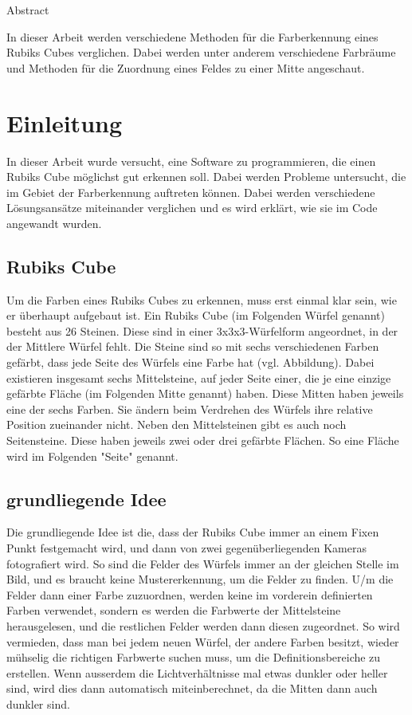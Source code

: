 \documentclass[a4paper, 12pt]{article}
\begin{document}
Abstract

In dieser Arbeit werden verschiedene Methoden für die Farberkennung eines Rubiks Cubes verglichen. Dabei werden unter anderem verschiedene Farbräume und Methoden für die Zuordnung eines Feldes zu einer Mitte angeschaut. 
\tableofcontents
\newpage
\section{Einleitung}
In dieser Arbeit wurde versucht, eine Software zu programmieren, die einen Rubiks Cube möglichst gut erkennen soll. Dabei werden Probleme untersucht, die im Gebiet der Farberkennung auftreten können. Dabei werden verschiedene Lösungsansätze miteinander verglichen und es wird erklärt, wie sie im Code angewandt wurden.
\subsection{Rubiks Cube}
Um die Farben eines Rubiks Cubes zu erkennen, muss erst einmal klar sein, wie er überhaupt aufgebaut ist. Ein Rubiks Cube (im Folgenden Würfel genannt) besteht aus 26 Steinen. Diese sind in einer 3x3x3-Würfelform angeordnet, in der der Mittlere Würfel fehlt. Die Steine sind so mit sechs verschiedenen Farben gefärbt, dass jede Seite des Würfels eine Farbe hat (vgl. Abbildung). Dabei existieren insgesamt sechs Mittelsteine, auf jeder Seite einer, die je eine einzige gefärbte Fläche (im Folgenden Mitte genannt) haben. Diese Mitten haben jeweils eine der sechs Farben. Sie ändern beim Verdrehen des Würfels ihre relative Position zueinander nicht. Neben den Mittelsteinen gibt es auch noch Seitensteine. Diese haben jeweils zwei oder drei gefärbte Flächen. So eine Fläche wird im Folgenden "Seite" genannt. 
\subsection{grundliegende Idee}
Die grundliegende Idee ist die, dass der Rubiks Cube immer an einem Fixen Punkt festgemacht wird, und dann von zwei gegenüberliegenden Kameras fotografiert wird. So sind die Felder des Würfels immer an der gleichen Stelle im Bild, und es braucht keine Mustererkennung, um die Felder zu finden. U/m die Felder dann einer Farbe zuzuordnen, werden keine im vorderein definierten Farben verwendet, sondern es werden die Farbwerte der Mittelsteine herausgelesen, und die restlichen Felder werden dann diesen zugeordnet. So wird vermieden, dass man bei jedem neuen Würfel, der andere Farben besitzt, wieder mühselig die richtigen Farbwerte suchen muss, um die Definitionsbereiche zu erstellen. Wenn ausserdem die Lichtverhältnisse  mal etwas dunkler oder heller sind, wird dies dann automatisch miteinberechnet, da die Mitten dann auch dunkler sind. 
\end{document}
